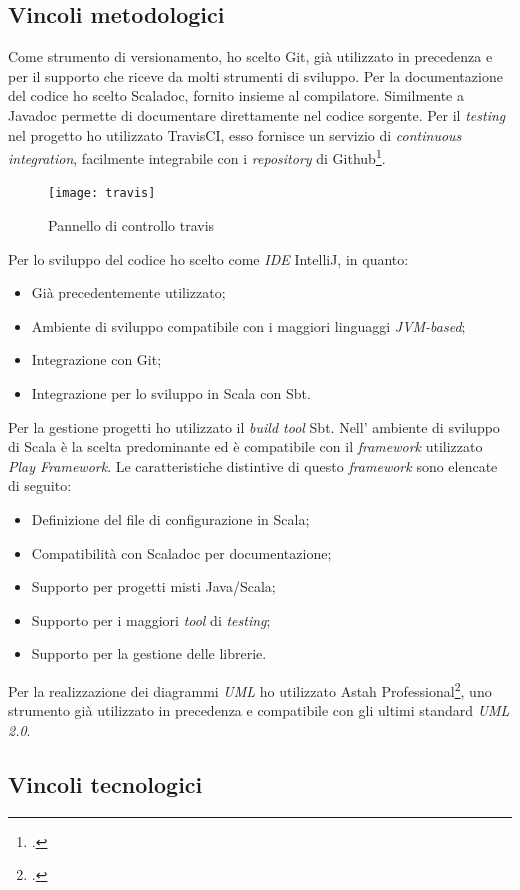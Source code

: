 \subsection{Vincoli metodologici}
Come strumento di versionamento, ho scelto Git, già utilizzato in precedenza e per il supporto che riceve da molti strumenti di sviluppo. Per la documentazione del codice ho scelto Scaladoc, fornito insieme al compilatore. Similmente a Javadoc permette di documentare direttamente nel codice sorgente. Per il \emph{testing} nel progetto ho utilizzato TravisCI, esso fornisce un servizio di \emph{continuous integration}, facilmente integrabile con i \emph{repository} di Github\footcite{https://github.com/}.
\begin{figure}[ht]
\centering
\texttt{[image: travis]}
\caption{Pannello di controllo travis}
\end{figure}
\newpage
Per lo sviluppo del codice ho scelto come \emph{IDE} IntelliJ, in quanto:
\begin{itemize}
\item Già precedentemente utilizzato;
\item Ambiente di sviluppo compatibile con i maggiori linguaggi \emph{JVM-based};
\item Integrazione con Git;
\item Integrazione per lo sviluppo in Scala con Sbt.
\end{itemize}
Per la gestione progetti ho utilizzato il \emph{build tool} Sbt. Nell' ambiente di sviluppo di Scala è la scelta predominante ed è compatibile con il \emph{framework} utilizzato \emph{Play Framework}. Le caratteristiche distintive di questo \emph{framework} sono elencate di seguito:
\begin{itemize}
\item Definizione del file di configurazione in Scala;
\item Compatibilità con Scaladoc per documentazione;
\item Supporto per progetti misti Java/Scala;
\item Supporto per i maggiori \emph{tool} di \emph{testing};
\item Supporto per la gestione delle librerie.
\end{itemize}
Per la realizzazione dei diagrammi \emph{UML} ho utilizzato Astah Professional\footcite{http://astah.net/}, uno strumento già utilizzato in precedenza e compatibile con gli ultimi standard \emph{UML 2.0}.
\subsection{Vincoli tecnologici}
